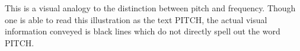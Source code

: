 This is a visual analogy to the distinction between pitch and frequency. Though one is able to read this illustration as the text \textsc{PITCH}, the actual visual information conveyed is black lines which do not directly spell out the word \textsc{PITCH}.